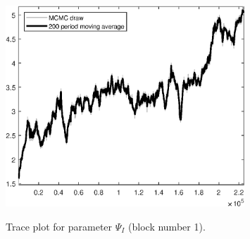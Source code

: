 \begin{figure}[H]
\centering
  \includegraphics[width=0.8\textwidth]{BRS_sectoral/graphs/TracePlot_Psi_I_blck_1}\\
    \caption{Trace plot for parameter ${\Psi_I}$ (block number 1).}
\end{figure}
